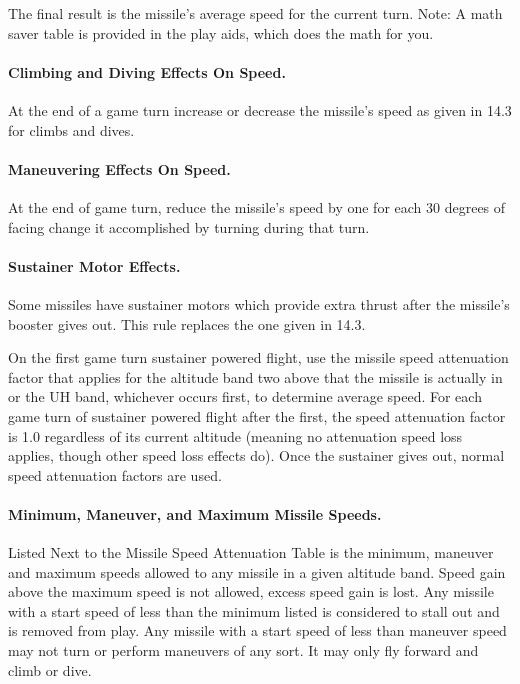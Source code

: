The final result is the missile's average speed for the current turn. Note: A math saver table is provided in the play aids, which does the math for you.

\paragraph{Climbing and Diving Effects On Speed.} At the end of a game turn increase or decrease the missile's speed as given in 14.3 for climbs and dives.

\paragraph{Maneuvering Effects On Speed.} At the end of game turn, reduce the missile's speed by one for each 30 degrees of facing change it accomplished by turning during that turn.

\paragraph{Sustainer Motor Effects.} Some missiles have sustainer motors which provide extra thrust after the missile's booster gives out. This rule replaces the one given in 14.3.

On the first game turn sustainer powered flight, use the missile speed attenuation factor that applies for the altitude band two above that the missile is actually in or the UH band, whichever occurs first, to determine average speed. For each game turn of sustainer powered flight after the first, the speed attenuation factor is 1.0 regardless of its current altitude (meaning no attenuation speed loss applies, though other speed loss effects do). Once the sustainer gives out, normal speed attenuation factors are used.

\paragraph{Minimum, Maneuver, and Maximum Missile Speeds.} Listed Next to the Missile Speed Attenuation Table is the minimum, maneuver and maximum speeds allowed to any missile in a given altitude band. Speed gain above the maximum speed is not allowed, excess speed gain is lost. Any missile with a start speed of less than the minimum listed is considered to stall out and is removed from play. Any missile with a start speed of less than maneuver speed may not turn or perform maneuvers of any sort. It may only fly forward and climb or dive.

